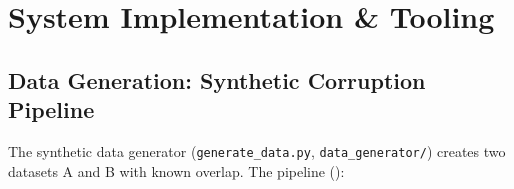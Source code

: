 \section{System Implementation \& Tooling}
\label{sec:implementation}

\subsection{Data Generation: Synthetic Corruption Pipeline}
\label{sec:data_generation}

The synthetic data generator (\texttt{generate\_data.py}, \texttt{data\_generator/}) creates two datasets A and B with known \globalentity{} overlap.
The pipeline ():

